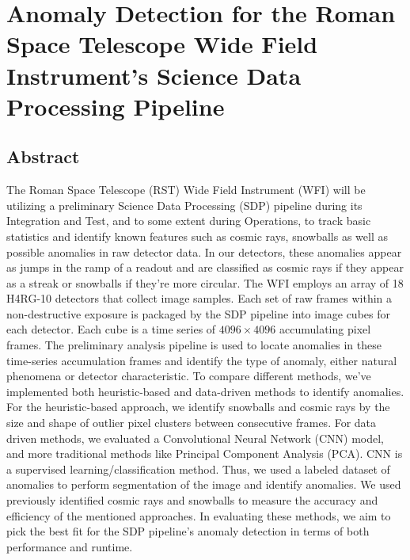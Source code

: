 \chapter[Anomaly Detection for the Roman Space Telescope Wide Field Instrument’s Science Data Processing Pipeline]{Anomaly Detection for the Roman Space Telescope Wide Field Instrument’s Science Data Processing Pipeline}

\section{Abstract}
The Roman Space Telescope (RST) Wide Field Instrument (WFI) will be utilizing a preliminary Science Data Processing (SDP) pipeline during its Integration and Test, and to some extent during Operations, to track basic statistics and identify known features such as cosmic rays, snowballs as well as possible anomalies in raw detector data. 
In our detectors, these anomalies appear as jumps in the ramp of a readout and are classified as cosmic rays if they appear as a streak or snowballs if they're more circular. 
The WFI employs an array of 18 H4RG-10 detectors that collect image samples.
Each set of raw frames within a non-destructive exposure is packaged by the SDP pipeline into image cubes for each detector.
Each cube is a time series of $4096 \times 4096$ accumulating pixel frames.
The preliminary analysis pipeline is used to locate anomalies in these time-series accumulation frames and identify the type of anomaly, either natural phenomena or detector characteristic.
To compare different methods, we've implemented both heuristic-based and data-driven methods to identify anomalies.
For the heuristic-based approach, we identify snowballs and cosmic rays by the size and shape of outlier pixel clusters between consecutive frames.
For data driven methods, we evaluated a Convolutional Neural Network (CNN) model, and more traditional methods like Principal Component Analysis (PCA).
CNN is a supervised learning/classification method. 
Thus, we used a labeled dataset of anomalies to perform segmentation of the image and identify anomalies. 
We used previously identified cosmic rays and snowballs to measure the accuracy and efficiency of the mentioned approaches. 
In evaluating these methods, we aim to pick the best fit for the SDP pipeline's anomaly detection in terms of both performance and runtime. 

